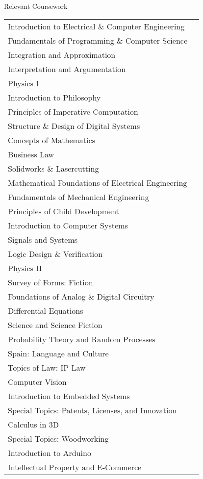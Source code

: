 \documentclass{resume} %
\begin{document}
\begin{Section}{Relevant Coursework}
\begin{tabular}{ @{} >{\series}l @{\hspace{6ex}} l }
Introduction to Electrical \& Computer Engineering \\
Fundamentals of Programming \& Computer Science \\
Integration and Approximation \\
Interpretation and Argumentation \\
Physics I \\
Introduction to Philosophy \\
Principles of Imperative Computation \\
Structure \& Design of Digital Systems \\
Concepts of Mathematics \\
Business Law \\
Solidworks \& Lasercutting \\
Mathematical Foundations of Electrical Engineering \\
Fundamentals of Mechanical Engineering \\
Principles of Child Development \\
Introduction to Computer Systems \\
Signals and Systems \\
Logic Design \& Verification \\
Physics II \\
Survey of Forms: Fiction \\
Foundations of Analog \& Digital Circuitry \\
Differential Equations \\
Science and Science Fiction \\
Probability Theory and Random Processes \\
Spain: Language and Culture \\
Topics of Law: IP Law \\
Computer Vision \\
Introduction to Embedded Systems \\
Special Topics: Patents, Licenses, and Innovation \\
Calculus in 3D \\
Special Topics: Woodworking \\
Introduction to Arduino \\
Intellectual Property and E-Commerce
\end{tabular}

\end{Section}
\end{document}
